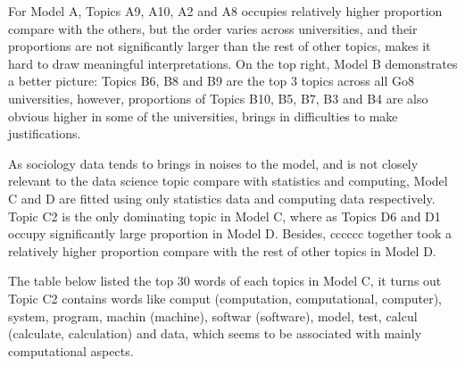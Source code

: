\documentclass[
  letterpaper,
]{report}
\begin{document}
For Model A, Topics A9, A10, A2 and A8 occupies relatively higher
proportion compare with the others, but the order varies across
universities, and their proportions are not significantly larger than
the rest of other topics, makes it hard to draw meaningful
interpretations. On the top right, Model B demonstrates a better
picture: Topics B6, B8 and B9 are the top 3 topics across all Go8
universities, however, proportions of Topics B10, B5, B7, B3 and B4 are
also obvious higher in some of the universities, brings in difficulties
to make justifications.

As sociology data tends to brings in noises to the model, and is not
closely relevant to the data science topic compare with statistics and
computing, Model C and D are fitted using only statistics data and
computing data respectively. Topic C2 is the only dominating topic in
Model C, where as Topics D6 and D1 occupy significantly large proportion
in Model D. Besides, cccccc together took a relatively higher proportion
compare with the rest of other topics in Model D.

The table below listed the top 30 words of each topics in Model C, it
turns out Topic C2 contains words like comput (computation,
computational, computer), system, program, machin (machine), softwar
(software), model, test, calcul (calculate, calculation) and data, which
seems to be associated with mainly computational aspects.
\end{document}
